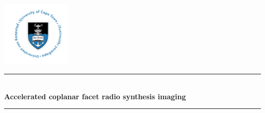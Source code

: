 \begin{titlepage}

\newcommand{\HRule}{\rule{\linewidth}{0.5mm}} %

\center %
 

\includegraphics[width=0.25\textwidth]{images/UCT-logo.jpg}\\[1cm] %



\HRule \\[0.4cm]
{ \huge \bfseries Accelerated coplanar facet radio synthesis imaging}\\[0.4cm]
\HRule \\[1.5cm]



\end{titlepage}
